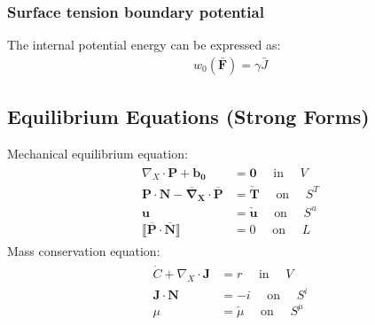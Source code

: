 \documentclass[12pt,3p]{article}
\numberwithin{equation}{section}
\begin{document}
\subsubsection{Surface tension boundary potential}
The internal potential energy can be expressed as: 
\begin{align}\label{STPotEnergy}
w_0 (\mathbf{\bar{F}}) = \gamma \bar{J}
\end{align}


\subsection{Equilibrium Equations (Strong Forms)}
Mechanical equilibrium equation: 
\begin{align}
\begin{split}
\nabla_{X} \cdot \mathbf{P}+\mathbf{b}_{\mathbf{0}} &= \mathbf{0} \quad \text { in } \quad V\\
\mathbf{P} \cdot \mathbf{N}-\overline{\boldsymbol{\nabla}}_{\boldsymbol{X}} \cdot \overline{\mathbf{P}}&=\check{\mathbf{T}} \quad \text { on } \quad S^{T}\\
\mathbf{u} &= \check{\mathbf{u}} \quad \text { on } \quad S^{u}\\
\llbracket \overline{\mathbf{P}} \cdot \overline{\mathbf{N}} \rrbracket &=0 \quad \text { on } \quad L
\end{split}
\end{align}
Mass conservation equation: 
\begin{align}
\begin{split}
\dot{C}+\nabla_{X} \cdot \mathbf{J} &=r \quad \text { in } \quad V \\
\mathbf{J} \cdot \mathbf{N} &=-i \quad \text { on } \quad S^{i} \\
\mu &= \check{\mu} \quad \text { on } \quad S^{\mu}
\end{split}
\end{align}

\end{document}
